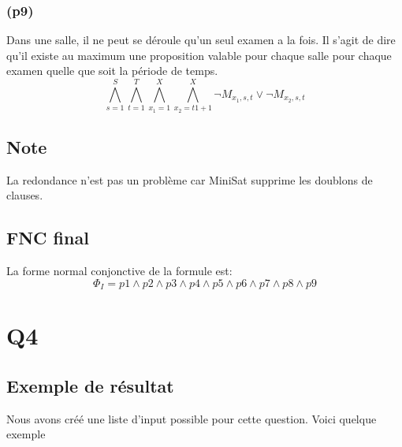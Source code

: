 \documentclass[a4paper,11pt]{article}
\begin{document}
\subsubsection{(p9)}
Dans une salle, il ne peut se déroule qu'un seul examen a la fois.
Il s'agit de dire qu'il existe au maximum une proposition valable pour chaque salle pour chaque examen quelle que soit la période de temps.
\begin{displaymath}
\bigwedge\limits_{s=1}^{S}\bigwedge\limits_{t=1}^{T}\bigwedge\limits_{x_{1}=1}^{X}\bigwedge\limits_{x_{2}=t1+1}^{X} \neg M_{x_{1}, s, t} \vee \neg M_{x_{2}, s, t}
\end{displaymath}

\subsection{Note}
La redondance n'est pas un problème car MiniSat supprime les doublons de clauses.

\subsection{FNC final}
La forme normal conjonctive de la formule est:
\begin{displaymath}
\Phi_{I} = p1 \wedge p2 \wedge p3 \wedge p4 \wedge p5 \wedge p6 \wedge p7 \wedge p8 \wedge p9
\end{displaymath}

\section{Q4}

\subsection{Exemple de résultat}
Nous avons créé une liste d'input possible pour cette question. Voici quelque exemple
\end{document}
